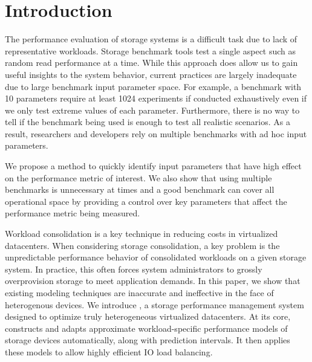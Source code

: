 \chapter{Introduction}
\label{intro_chapter}




The performance evaluation of storage systems is a difficult task due to lack of representative workloads. Storage benchmark tools test a single aspect such as random read performance at a time. While this approach does allow us to gain useful insights to the system behavior, current practices are largely inadequate due to large benchmark input parameter space. For example, a benchmark with 10 parameters require at least 1024 experiments if conducted exhaustively even if we only test extreme values of each parameter. Furthermore, there is no way to tell if the benchmark being used is enough to test all realistic scenarios. As a result, researchers and developers rely on multiple benchmarks with ad hoc input parameters.

We propose a method to quickly identify input parameters that have high effect on the performance metric of interest. We also show that using multiple benchmarks is unnecessary at times and a good benchmark can cover all operational space by providing a control over key parameters that affect the performance metric being measured. 


Workload consolidation is a key technique in reducing costs in virtualized datacenters.
When considering storage consolidation, a key problem is the unpredictable performance behavior of consolidated workloads on a given storage system.
In practice, this often forces system administrators to grossly overprovision storage to meet application demands.
In this paper, we show that existing modeling techniques are inaccurate and ineffective in the face of heterogenous devices.
We introduce {\em\romano}, a storage performance management system designed to optimize truly heterogeneous virtualized datacenters.
At its core, \romano constructs and adapts approximate workload-specific performance models of storage devices automatically, along with prediction intervals.
It then applies these models to allow highly efficient IO load balancing.

